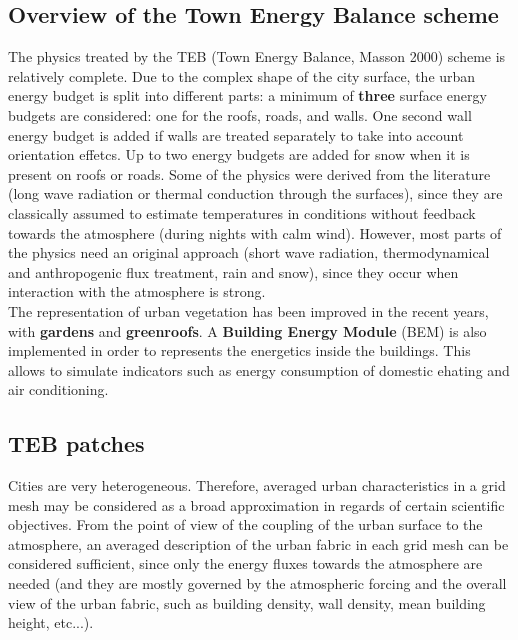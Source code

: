 \subsection{Overview of the Town Energy Balance scheme}

The physics treated by the TEB (Town Energy Balance, Masson 2000) scheme is relatively complete.
Due to the complex shape of the city surface, the urban energy budget
is split into different parts: a minimum of {\bf three} surface
energy budgets are considered: one for the roofs,
roads, and walls. 
One second wall energy budget is added if walls are treated separately to take into account orientation effetcs.
Up to two energy budgets are
added for snow when it is present on roofs or roads.
Some of the physics were derived from the literature (long wave radiation or
thermal conduction through the surfaces), since they are classically assumed
to estimate temperatures in conditions
without feedback towards the atmosphere (during  nights with calm wind).
However, most parts of the physics need an original approach
(short wave radiation,
thermodynamical and anthropogenic flux treatment, rain and snow),
since they occur when interaction with the atmosphere is strong. \\

The representation of urban vegetation has been improved in the recent years, with {\bf gardens} and {\bf greenroofs}. A {\bf Building Energy Module} (BEM) is also implemented in order to represents the energetics inside the buildings. This allows to simulate indicators such as energy consumption of domestic ehating and air conditioning. \\



\subsection{TEB patches}

Cities are very heterogeneous. Therefore, averaged urban characteristics in a grid mesh may be considered as a broad approximation in regards of certain scientific objectives. From the point of view of the coupling of the urban surface to the atmosphere, an averaged description of the urban fabric in each grid mesh can be considered sufficient, since only the energy fluxes towards the atmosphere are needed (and they are mostly governed by the atmospheric forcing and the overall view of the urban fabric, such as building density, wall density, mean building height, etc...).\\

